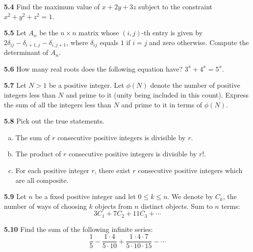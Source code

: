 \documentclass[11pt,a4paper]{article}
\newcommand{\qitem}[1]{\par\medskip\noindent\textbf{#1}\hspace{0.5em}}
\begin{document}
\qitem{5.4} Find the maximum value of $x + 2y + 3z$ subject to the constraint $x^2 + y^2 + z^2 = 1$.

\qitem{5.5} Let $A_n$ be the $n \times n$ matrix whose $(i, j)$-th entry is given by $2\delta_{ij} - \delta_{i+1,j} - \delta_{i,j+1}$, where $\delta_{ij}$ equals $1$ if $i = j$ and zero otherwise. Compute the determinant of $A_n$.

\qitem{5.6} How many real roots does the following equation have? $3^x + 4^x = 5^x$.

\qitem{5.7} Let $N > 1$ be a positive integer. Let $\phi(N)$ denote the number of positive integers less than $N$ and prime to it (unity being included in this count). Express the sum of all the integers less than $N$ and prime to it in terms of $\phi(N)$.

\qitem{5.8} Pick out the true statements.
\begin{enumerate}[a.]
  \item The sum of $r$ consecutive positive integers is divisible by $r$.
  \item The product of $r$ consecutive positive integers is divisible by $r!$.
  \item For each positive integer $r$, there exist $r$ consecutive positive integers which are all composite.
\end{enumerate}

\qitem{5.9} Let $n$ be a fixed positive integer and let $0 \le k \le n$. We denote by $C_k$, the number of ways of choosing $k$ objects from $n$ distinct objects. Sum to $n$ terms:
\[
  3C_1 + 7C_2 + 11C_3 + \cdots
\]

\qitem{5.10} Find the sum of the following infinite series:
\[
  \frac{1}{5} - \frac{1\cdot 4}{5\cdot 10} + \frac{1\cdot 4\cdot 7}{5\cdot 10\cdot 15} - \cdots
\]
\end{document}
